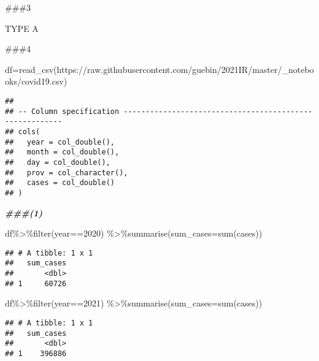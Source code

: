 \documentclass[
]{article}
\newenvironment{Shaded}{\begin{snugshade}}{\end{snugshade}}
\newcommand{\AttributeTok}[1]{\textcolor[rgb]{0.77,0.63,0.00}{#1}}
\newcommand{\DecValTok}[1]{\textcolor[rgb]{0.00,0.00,0.81}{#1}}
\newcommand{\DocumentationTok}[1]{\textcolor[rgb]{0.56,0.35,0.01}{\textbf{\textit{#1}}}}
\newcommand{\FunctionTok}[1]{\textcolor[rgb]{0.00,0.00,0.00}{#1}}
\newcommand{\NormalTok}[1]{#1}
\newcommand{\OtherTok}[1]{\textcolor[rgb]{0.56,0.35,0.01}{#1}}
\newcommand{\SpecialCharTok}[1]{\textcolor[rgb]{0.00,0.00,0.00}{#1}}
\newcommand{\StringTok}[1]{\textcolor[rgb]{0.31,0.60,0.02}{#1}}
\begin{document}
\#\#\#3

TYPE A

\#\#\#4

\begin{Shaded}
\begin{Highlighting}[]
\NormalTok{df}\OtherTok{=}\FunctionTok{read\_csv}\NormalTok{(}\StringTok{\textquotesingle{}https://raw.githubusercontent.com/guebin/2021IR/master/\_notebooks/covid19.csv\textquotesingle{}}\NormalTok{)}
\end{Highlighting}
\end{Shaded}

\begin{verbatim}
## 
## -- Column specification --------------------------------------------------------
## cols(
##   year = col_double(),
##   month = col_double(),
##   day = col_double(),
##   prov = col_character(),
##   cases = col_double()
## )
\end{verbatim}

\begin{Shaded}
\begin{Highlighting}[]
\DocumentationTok{\#\#\#(1)}

\NormalTok{df}\SpecialCharTok{\%\textgreater{}\%}\FunctionTok{filter}\NormalTok{(year}\SpecialCharTok{==}\DecValTok{2020}\NormalTok{) }\SpecialCharTok{\%\textgreater{}\%}\FunctionTok{summarise}\NormalTok{(}\AttributeTok{sum\_cases=}\FunctionTok{sum}\NormalTok{(cases))}
\end{Highlighting}
\end{Shaded}

\begin{verbatim}
## # A tibble: 1 x 1
##   sum_cases
##       <dbl>
## 1     60726
\end{verbatim}

\begin{Shaded}
\begin{Highlighting}[]
\NormalTok{df}\SpecialCharTok{\%\textgreater{}\%}\FunctionTok{filter}\NormalTok{(year}\SpecialCharTok{==}\DecValTok{2021}\NormalTok{) }\SpecialCharTok{\%\textgreater{}\%}\FunctionTok{summarise}\NormalTok{(}\AttributeTok{sum\_cases=}\FunctionTok{sum}\NormalTok{(cases))}
\end{Highlighting}
\end{Shaded}

\begin{verbatim}
## # A tibble: 1 x 1
##   sum_cases
##       <dbl>
## 1    396886
\end{verbatim}
\end{document}
